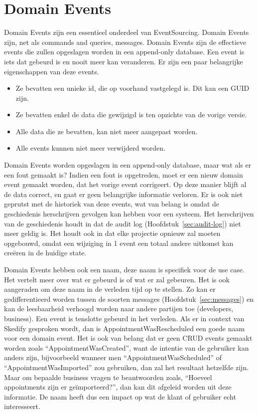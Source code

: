 
\section{Domain Events}
\label{sec:domain-events}

Domain Events zijn een essentieel onderdeel van EventSourcing. Domain Events zijn, net als commands and queries, messages. Domain Events zijn de effectieve events die zullen opgeslagen worden in een append-only database. Een event is iets dat gebeurd is en nooit meer kan veranderen. Er zijn een paar belangrijke eigenschappen van deze events.

\begin{itemize}
  \item{Ze bevatten een unieke id, die op voorhand vastgelegd is. Dit kan een \gls{GUID} zijn.}
  \item{Ze bevatten enkel de data die gewijzigd is ten opzichte van de vorige versie.}
  \item{Alle data die ze bevatten, kan niet meer aangepast worden.}
  \item{Alle events kunnen niet meer verwijderd worden.}
\end{itemize}

Domain Events worden opgeslagen in een append-only database, maar wat als er een fout gemaakt is? Indien een fout is opgetreden, moet er een nieuw domain event gemaakt worden, dat het vorige event corrigeert. Op deze manier blijft al de data correct, en gaat er geen belangrijke informatie verloren. Er is ook niet geprutst met de historiek van deze events, wat van belang is omdat de geschiedenis herschrijven gevolgen kan hebben voor een systeem. Het herschrijven van de geschiedenis houdt in dat de audit log (Hoofdstuk~\ref{sec:audit-log}) niet meer geldig is. Het houdt ook in dat elke projectie opnieuw zal moeten opgebouwd, omdat een wijziging in 1 event een totaal andere uitkomst kan creëren in de huidige \gls{state}.

Domain Events hebben ook een naam, deze naam is specifiek voor de use case. Het vertelt meer over wat er gebeurd is of wat er zal gebeuren. Het is ook aangeraden om deze naam in de verleden tijd op te stellen. Zo kan er gedifferentieerd worden tussen de soorten messages (Hoofdstuk~\ref{sec:messages}) en kan de leesbaarheid verhoogd worden naar andere partijen toe (developers, business). Een event is tenslotte gebeurd in het verleden. Als er in context van Skedify gesproken wordt, dan is AppointmentWasRescheduled een goede naam voor een domain event. Het is ook van belang dat er geen \gls{CRUD} events gemaakt worden zoals ``AppointmentWasCreated'', want de intentie van de gebruiker kan anders zijn, bijvoorbeeld wanneer men ``AppointmentWasScheduled'' of ``AppointmentWasImported'' zou gebruiken, dan zal het resultaat hetzelfde zijn. Maar om bepaalde business vragen te beantwoorden zoals, ``Hoeveel appointments zijn er geïmporteerd?'', dan kan dit afgeleid worden uit deze informatie. De naam heeft dus een impact op wat de klant of gebruiker echt interesseert.
